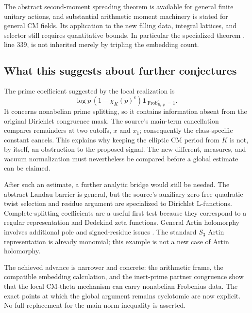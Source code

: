 The abstract second-moment spreading theorem is available for
general finite unitary actions, and substantial arithmetic moment
machinery is stated for general CM fields. Its application to the
new filling data, integral lattices, and selector still requires
quantitative bounds. In particular the specialized theorem
,
line 339, is not inherited merely by tripling the embedding count.

\subsection{What this suggests about further conjectures}

The prime coefficient suggested by the local realization is
\[
 \log p\,(1-\chi_K(p)^e)
 \mathbf1_{\operatorname{Frob}_{B_0,p}^{e}=1}.
\]
It concerns nonabelian prime splitting, so it contains information
absent from the original Dirichlet congruence mask. The source's
main-term cancellation compares remainders at two cutoffs, $x$ and
$x_1$; consequently the class-specific constant cancels. This
explains why keeping the elliptic CM period from $K$ is not, by
itself, an obstruction to the proposed signal. The new different,
measures, and vacuum normalization must nevertheless be compared
before a global estimate can be claimed.

After such an estimate, a further analytic bridge would still be
needed. The abstract Landau barrier is general, but the source's
auxiliary zero-free quadratic-twist selection and residue argument
are specialized to Dirichlet L-functions. Complete-splitting
coefficients are a useful first test because they correspond to a
regular representation and Dedekind zeta functions. General Artin
holomorphy involves additional pole and signed-residue issues
\cite{Cogdell}. The standard $S_3$ Artin representation is already
monomial; this example is not a new case of Artin holomorphy.

The achieved advance is narrower and concrete: the arithmetic
frame, the compatible embedding calculation, and the inert-prime
partner congruence show that the local CM-theta mechanism can carry
nonabelian Frobenius data. The exact points at which the global
argument remains cyclotomic are now explicit. No full replacement
for the main norm inequality is asserted.
